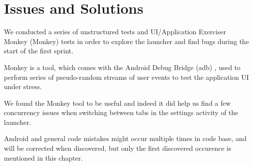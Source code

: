 
\chapter{Issues and Solutions}

We conducted a series of unstructured tests and UI/Application Exerciser Monkey (Monkey) \parencite{android_monkey} tests in order to explore the launcher and find bugs during the start of the first sprint. 

Monkey is a tool, which comes with the Android Debug Bridge (adb) \parencite{android_adb}, used to perform series of pseudo-random streams of user events to test the application UI under stress.

We found the Monkey tool to be useful and indeed it did help us find a few concurrency issues when switching between tabs in the settings activity of the launcher.

Android and general code mistakes might occur multiple times in code base, and will be corrected when discovered, but only the first discovered occurence is mentioned in this chapter. 







